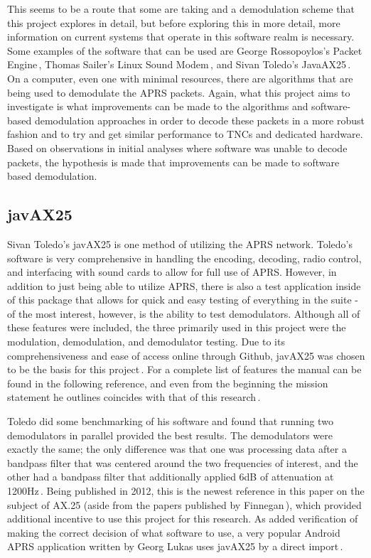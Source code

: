 This seems to be a route that some are taking and a demodulation scheme that this project explores in detail, but before exploring this in more detail, more information on current systems that operate in this software realm is necessary. Some examples of the software that can be used are George Rossopoylos's Packet Engine\,\cite{Rossopoylos}, Thomas Sailer's Linux Sound Modem\,\cite{Sailer1997,Sailer2000}, and Sivan Toledo's JavaAX25\,\cite{javax25github, Toledo2012a}. On a computer, even one with minimal resources, there are algorithms that are being used to demodulate the APRS packets. Again, what this project aims to investigate is what improvements can be made to the algorithms and software-based demodulation approaches in order to decode these packets in a more robust fashion and to try and get similar performance to TNCs and dedicated hardware. Based on observations in initial analyses where software was unable to decode packets, the hypothesis is made that improvements can be made to software based demodulation.

\subsection{javAX25}
Sivan Toledo's javAX25 is one method of utilizing the APRS network. Toledo's software is very comprehensive in handling the encoding, decoding, radio control, and interfacing with sound cards to allow for full use of APRS. However, in addition to just being able to utilize APRS, there is also a test application inside of this package that allows for quick and easy testing of everything in the suite - of the most interest, however, is the ability to test demodulators. Although all of these features were included, the three primarily used in this project were the modulation, demodulation, and demodulator testing. Due to its comprehensiveness and ease of access online through Github, javAX25 was chosen to be the basis for this project\,\cite{javax25github}. For a complete list of features the manual can be found in the following reference, and even from the beginning the mission statement he outlines coincides with that of this research\,\cite{Toledo2012a}.

Toledo did some benchmarking of his software and found that running two demodulators in parallel provided the best results. The demodulators were exactly the same; the only difference was that one was processing data after a bandpass filter that was centered around the two frequencies of interest, and the other had a bandpass filter that additionally applied 6dB of attenuation at 1200Hz\,\cite{Toledo2012}. Being published in 2012, this is the newest reference in this paper on the subject of AX.25 (aside from the papers published by Finnegan\,\cite{KWFThesis, KWFTAPR}), which provided additional incentive to use this project for this research. As added verification of making the correct decision of what software to use, a very popular Android APRS application written by Georg Lukas uses javAX25 by a direct import\,\cite{APRSdroid}.